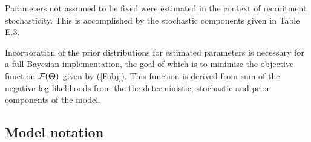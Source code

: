 \documentclass[11pt]{book}
\newcommand{\Fobj}{\mathcal{F}}%
\def\bfTh{{\bf \Theta}}%
\def\AppLet{E}%
\def\bfTh{{\bf \Theta}}%
\newcommand{\eref}[1]{(\ref{#1})}
\begin{document}
Parameters not assumed to be fixed were estimated in the context of recruitment stochasticity.
This is accomplished by the stochastic components given in Table \AppLet.3. 

Incorporation of the prior distributions for estimated parameters is necessary for a full Bayesian implementation, the goal of which is to minimise the objective function $\Fobj(\bfTh)$ given by \eref{Fobj}. 
This function is derived from sum of the negative log likelihoods from the the deterministic, stochastic and prior components of the model.


\subsection{Model notation}

\setlength\tabcolsep{0pt}

\end{document}
